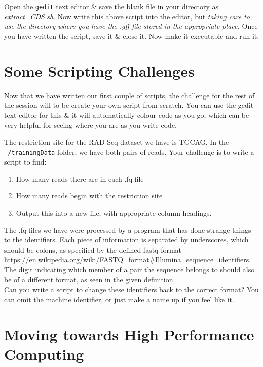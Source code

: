 \begin{steps}
Open the \texttt{gedit} text editor \& save the blank file in your directory as \textit{extract\_CDS.sh}.
Now write this above script into the editor, but \textit{taking care to use the directory where you have the .gff file stored in the appropriate place.}
Once you have written the script, save it \& close it.
Now make it executable and run it.\\
\end{steps}


\section{Some Scripting Challenges}
Now that we have written our first couple of scripts, the challenge for the rest of the session will to be create your own script from scratch.
You can use the gedit text editor for this \& it will automatically colour code as you go, which can be very helpful for seeing where you are as you write code.

\begin{advanced}
The restriction site for the RAD-Seq dataset we have is TGCAG.
In the \texttt{~/trainingData} folder, we have both pairs of reads.
Your challenge is to write a script to find:
\begin{enumerate}
\item How many reads there are in each .fq file
\item How many reads begin with the restriction site
\item Output this into a new file, with appropriate column headings. \\
\end{enumerate}

The .fq files we have were processed by a program that has done strange things to the identifiers.
Each piece of information is separated by underscores, which should be colons, as specified by the defined fastq format \url{https://en.wikipedia.org/wiki/FASTQ\_format#Illumina\_sequence\_identifiers}.
The digit indicating which member of a pair the sequence belongs to should also be of a different format, as seen in the given definition.\\

Can you write a script to change these identifiers back to the correct format? 
You can omit the machine identifier, or just make a name up if you feel like it.
\end{advanced}

\section{Moving towards High Performance Computing}
